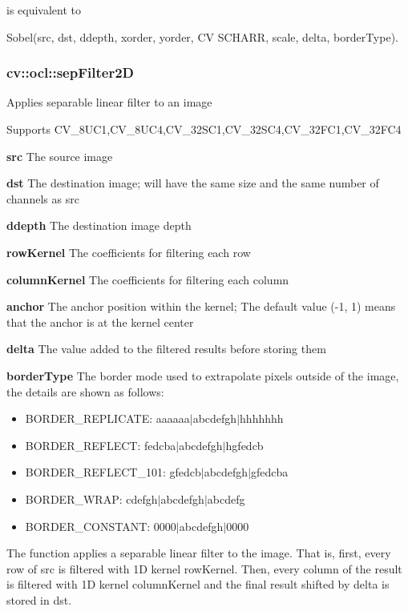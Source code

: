 \documentclass{article}
\begin{document}
is equivalent to

\begin{center}
Sobel(src, dst, ddepth, xorder, yorder, CV SCHARR, scale, delta,
borderType).
\end{center}

\newpage

\subsubsection{cv::ocl::sepFilter2D}
\label{subsubsec:mylabel43}
Applies separable linear filter to an image

Supports CV{\_}8UC1,CV{\_}8UC4,CV{\_}32SC1,CV{\_}32SC4,CV{\_}32FC1,CV{\_}32FC4

\textbf{src }The source image

\textbf{dst }The destination image; will have the same size and the same
number of channels as src

\textbf{ddepth }The destination image depth

\textbf{rowKernel }The coefficients for filtering each row

\textbf{columnKernel }The coefficients for filtering each column

\textbf{anchor }The anchor position within the kernel; The default value
(-1, 1) means that the anchor is at the kernel center

\textbf{delta }The value added to the filtered results before storing them

\textbf{borderType }The border mode used to extrapolate pixels outside of
the image, the details are shown as follows:

\begin{itemize}
\item BORDER{\_}REPLICATE: aaaaaa$\vert $abcdefgh$\vert $hhhhhhh
\item BORDER{\_}REFLECT: fedcba$\vert $abcdefgh$\vert $hgfedcb
\item BORDER{\_}REFLECT{\_}101: gfedcb$\vert $abcdefgh$\vert $gfedcba
\item BORDER{\_}WRAP: cdefgh$\vert $abcdefgh$\vert $abcdefg
\item BORDER{\_}CONSTANT: 0000$\vert $abcdefgh$\vert $0000
\end{itemize}

The function applies a separable linear filter to the image. That is, first,
every row of src is filtered with 1D kernel rowKernel. Then, every column of
the result is filtered with 1D kernel columnKernel and the final result
shifted by delta is stored in dst.
\end{document}
